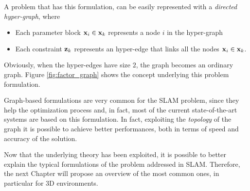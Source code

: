A problem that has this formulation, can be easily represented with a \textit{directed hyper-graph}, where

\begin{itemize}
    \item Each parameter block $\mathbf{x}_i \in \mathbf{x}_k$ represents a node $i$ in the hyper-graph
    \item Each constraint $\mathbf{z}_k$ represents an hyper-edge that links all the nodes $\mathbf{x}_i \in \mathbf{x}_k$.
\end{itemize}

\noindent Obviously, when the hyper-edges have size $2$, the graph becomes an ordinary graph. Figure \ref{fig:factor_graph} shows the concept underlying this problem formulation.

Graph-based formulations are very common for the SLAM problem, since they help the optimization process and, in fact, most of the current state-of-the-art systems are based on this formulation. In fact, exploiting the \textit{topology} of the graph it is possible to achieve better performances, both in terms of speed and accuracy of the solution.

\vspace{15px}

Now that the underlying theory has been exploited, it is possible to better explain the typical formulations of the problem addressed in SLAM. Therefore, the next Chapter will propose an overview of the most common ones, in particular for 3D environments.